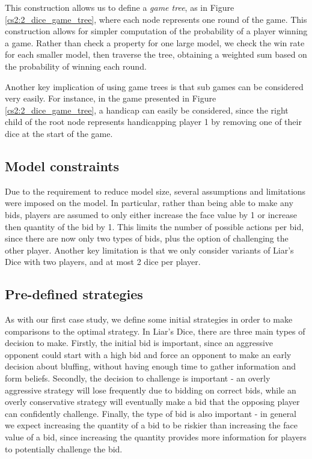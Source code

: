 This construction allows us to define a \emph{game tree}, as in Figure \ref{cs2:2_dice_game_tree}, where each node represents one round of the game. This construction allows for simpler computation of the probability of a player winning a game. Rather than check a property for one large model, we check the win rate for each smaller model, then traverse the tree, obtaining a weighted sum based on the probability of winning each round.

Another key implication of using game trees is that sub games can be considered very easily. For instance, in the game presented in Figure \ref{cs2:2_dice_game_tree}, a handicap can easily be considered, since the right child of the root node represents handicapping player 1 by removing one of their dice at the start of the game.

\subsection{Model constraints}

Due to the requirement to reduce model size, several assumptions and limitations were imposed on the model. In particular, rather than being able to make any bids, players are assumed to only either increase the face value by 1 or increase then quantity of the bid by 1. This limits the number of possible actions per bid, since there are now only two types of bids, plus the option of challenging the other player. Another key limitation is that we only consider variants of Liar's Dice with two players, and at most 2 dice per player.

\subsection{Pre-defined strategies}

As with our first case study, we define some initial strategies in order to make comparisons to the optimal strategy. In Liar's Dice, there are three main types of decision to make. Firstly, the initial bid is important, since an aggressive opponent could start with a high bid and force an opponent to make an early decision about bluffing, without having enough time to gather information and form beliefs. Secondly, the decision to challenge is important - an overly aggressive strategy will lose frequently due to bidding on correct bids, while an overly conservative strategy will eventually make a bid that the opposing player can confidently challenge. Finally, the type of bid is also important - in general we expect increasing the quantity of a bid to be riskier than increasing the face value of a bid, since increasing the quantity provides more information for players to potentially challenge the bid.


